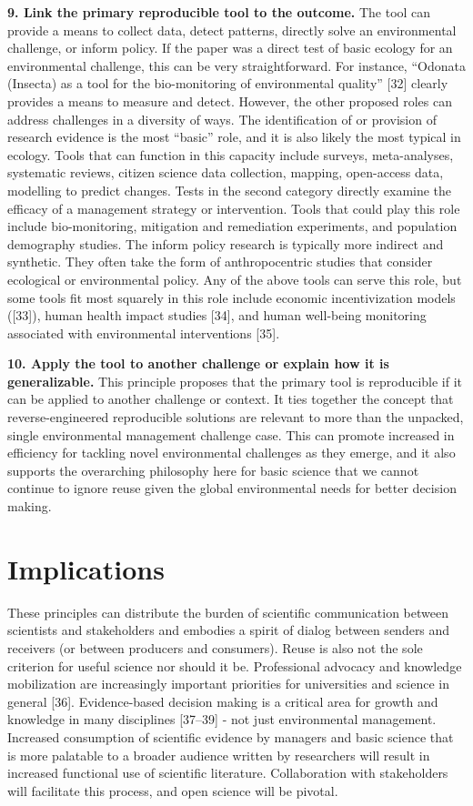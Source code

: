 \documentclass[10pt,letterpaper]{article}
\begin{document}
\textbf{9. Link the primary reproducible tool to the outcome.} The tool
can provide a means to collect data, detect patterns, directly solve an
environmental challenge, or inform policy. If the paper was a direct
test of basic ecology for an environmental challenge, this can be very
straightforward. For instance, ``Odonata (Insecta) as a tool for the
bio-monitoring of environmental quality'' {[}32{]} clearly provides a
means to measure and detect. However, the other proposed roles can
address challenges in a diversity of ways. The identification of or
provision of research evidence is the most ``basic'' role, and it is
also likely the most typical in ecology. Tools that can function in this
capacity include surveys, meta-analyses, systematic reviews, citizen
science data collection, mapping, open-access data, modelling to predict
changes. Tests in the second category directly examine the efficacy of a
management strategy or intervention. Tools that could play this role
include bio-monitoring, mitigation and remediation experiments, and
population demography studies. The inform policy research is typically
more indirect and synthetic. They often take the form of anthropocentric
studies that consider ecological or environmental policy. Any of the
above tools can serve this role, but some tools fit most squarely in
this role include economic incentivization models ({[}33{]}), human
health impact studies {[}34{]}, and human well-being monitoring
associated with environmental interventions {[}35{]}.

\textbf{10. Apply the tool to another challenge or explain how it is
generalizable.} This principle proposes that the primary tool is
reproducible if it can be applied to another challenge or context. It
ties together the concept that reverse-engineered reproducible solutions
are relevant to more than the unpacked, single environmental management
challenge case. This can promote increased in efficiency for tackling
novel environmental challenges as they emerge, and it also supports the
overarching philosophy here for basic science that we cannot continue to
ignore reuse given the global environmental needs for better decision
making.

\section{Implications}\label{implications}

These principles can distribute the burden of scientific communication
between scientists and stakeholders and embodies a spirit of dialog
between senders and receivers (or between producers and consumers).
Reuse is also not the sole criterion for useful science nor should it
be. Professional advocacy and knowledge mobilization are increasingly
important priorities for universities and science in general {[}36{]}.
Evidence-based decision making is a critical area for growth and
knowledge in many disciplines {[}37--39{]} - not just environmental
management. Increased consumption of scientific evidence by managers and
basic science that is more palatable to a broader audience written by
researchers will result in increased functional use of scientific
literature. Collaboration with stakeholders will facilitate this
process, and open science will be pivotal.
\end{document}
